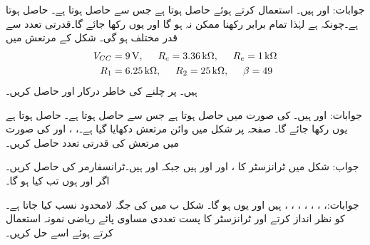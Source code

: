 جوابات: اور  ہیں۔ استعمال کرتے ہوئے حاصل ہوتا ہے جس سے  حاصل ہوتا ہے۔ حاصل ہوتا ہے۔چونکہ  ہے لہٰذا تمام  برابر رکھنا ممکن نہ ہو گا اور یوں  رکھا جائے گا۔قدرتی تعدد  سے قدر مختلف ہو گی۔
شکل  کے  مرتعش میں
\begin{align*}
V_{CC}&=\SI{9}{\volt}, \hspace{5mm} R_c=\SI{3.36}{\kilo \ohm}, \hspace{5mm} R_e=\SI{1}{\kilo \ohm}\\
R_1&=\SI{6.25}{\kilo \ohm}, \hspace{5mm} R_2=\SI{25}{\kilo \ohm}, \hspace{5mm} \beta=49
\end{align*}
ہیں۔ پر چلنے کی خاطر درکار  اور  حاصل کریں۔

جوابات: اور  ہیں۔ کی صورت میں  حاصل ہوتا ہے جس سے  حاصل ہوتا ہے۔ حاصل ہوتا ہے  یوں  رکھا جائے گا۔
صفحہ  پر شکل  میں وائن مرتعش دکھایا گیا ہے۔، ،  اور  کی صورت میں مرتعش کی قدرتی تعدد حاصل کریں۔

جواب:
شکل  میں ٹرانزسٹر کا ،  اور  اور  ہیں جبکہ  اور  ہیں۔ٹرانسفارمر کی  حاصل کریں۔اگر  اور  ہوں تب  کیا ہو گا۔

جوابات:، ، ، ، ، ، ،  ہیں اور یوں  ہو گا۔
شکل  ب میں  کی جگہ لامحدود  نسب کیا جاتا ہے۔ کو نظر انداز کرتے اور ٹرانزسٹر کا پست تعددی مساوی پائے ریاضی نمونہ استعمال کرتے ہوئے اسے حل کریں۔


